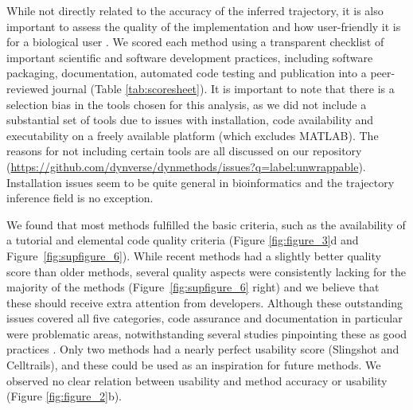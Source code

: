 While not directly related to the accuracy of the inferred trajectory, it is also important to assess the quality of the implementation and how user-friendly it is for a biological user \cite{taschuk_tensimplerules_2017}. We scored each method using a transparent checklist of important scientific and software development practices, including software packaging, documentation, automated code testing and publication into a peer-reviewed journal (Table \ref{tab:scoresheet}). It is important to note that there is a selection bias in the tools chosen for this analysis, as we did not include a substantial set of tools due to issues with installation, code availability and executability on a freely available platform (which excludes MATLAB). The reasons for not including certain tools are all discussed on our repository (\url{https://github.com/dynverse/dynmethods/issues?q=label:unwrappable}). Installation issues seem to be quite general in bioinformatics \cite{mangul_comprehensiveanalysisusability_2018} and the trajectory inference field is no exception.

We found that most methods fulfilled the basic criteria, such as the availability of a tutorial and elemental code quality criteria (Figure \ref{fig:figure_3}d and Figure~\ref{fig:supfigure_6}). While recent methods had a slightly better quality score than older methods, several quality aspects were consistently lacking for the majority of the methods (Figure~\ref{fig:supfigure_6} right) and we believe that these should receive extra attention from developers. Although these outstanding issues covered all five categories, code assurance and documentation in particular were problematic areas, notwithstanding several studies pinpointing these as good practices \cite{wilson_bestpracticesscientific_2014,artaza_top10metrics_2016}. Only two methods had a nearly perfect usability score (Slingshot and Celltrails), and these could be used as an inspiration for future methods. We observed no clear relation between usability and method accuracy or usability (Figure \ref{fig:figure_2}b).


